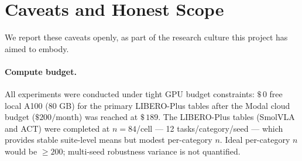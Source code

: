 \documentclass[11pt,a4paper]{article}
\begin{document}
\section{Caveats and Honest Scope}
\label{sec:caveats}

We report these caveats openly, as part of the research culture this project has aimed to embody.

\paragraph{Compute budget.}
All experiments were conducted under tight GPU budget constraints: $\$\,0$ free local A100
(80 GB) for the primary LIBERO-Plus tables after the Modal cloud budget ($\$200/\text{month}$)
was reached at $\$\,189$. The LIBERO-Plus tables (SmolVLA and ACT) were completed at $n=84$/cell —
12 tasks/category/seed — which provides stable suite-level means but modest per-category $n$.
Ideal per-category $n$ would be $\geq 200$; multi-seed robustness variance is not quantified.
\end{document}
